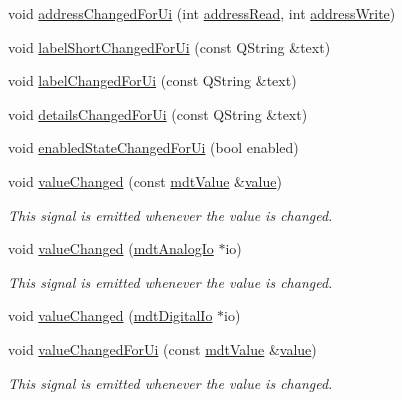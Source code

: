 \begin{DoxyCompactItemize}
\item 
void \hyperlink{classmdt_abstract_io_ab7021086e4d4ded1e4487a2e60383d0e}{address\-Changed\-For\-Ui} (int \hyperlink{classmdt_abstract_io_a710119785e128ca39092e99593bc7dac}{address\-Read}, int \hyperlink{classmdt_abstract_io_aa62d29a8f8f97b3c8e382ad608048ab4}{address\-Write})
\item 
void \hyperlink{classmdt_abstract_io_aa12930a4316d7679668a07855c92e625}{label\-Short\-Changed\-For\-Ui} (const Q\-String \&text)
\item 
void \hyperlink{classmdt_abstract_io_ab87859883a00193ac680c09cfef8dc84}{label\-Changed\-For\-Ui} (const Q\-String \&text)
\item 
void \hyperlink{classmdt_abstract_io_aa6add53c265560420b70852ba490c2ff}{details\-Changed\-For\-Ui} (const Q\-String \&text)
\item 
void \hyperlink{classmdt_abstract_io_a4406bc16e8decdb506b34d9ca679203e}{enabled\-State\-Changed\-For\-Ui} (bool enabled)
\item 
void \hyperlink{classmdt_abstract_io_a43feaa62996af78f64aea084122f1370}{value\-Changed} (const \hyperlink{classmdt_value}{mdt\-Value} \&\hyperlink{classmdt_abstract_io_a839b0d3a4a1d4616e5b20d744c5f75a1}{value})
\begin{DoxyCompactList}\small\item\em This signal is emitted whenever the value is changed. \end{DoxyCompactList}\item 
void \hyperlink{classmdt_abstract_io_a741fe409fdbe68002fdca3e7f7fdbac1}{value\-Changed} (\hyperlink{classmdt_analog_io}{mdt\-Analog\-Io} $\ast$io)
\begin{DoxyCompactList}\small\item\em This signal is emitted whenever the value is changed. \end{DoxyCompactList}\item 
void \hyperlink{classmdt_abstract_io_a0cde4ddd086886c50bfaeef27ac9de3b}{value\-Changed} (\hyperlink{classmdt_digital_io}{mdt\-Digital\-Io} $\ast$io)
\item 
void \hyperlink{classmdt_abstract_io_a0241183736b9bc3abb021868b9bf4273}{value\-Changed\-For\-Ui} (const \hyperlink{classmdt_value}{mdt\-Value} \&\hyperlink{classmdt_abstract_io_a839b0d3a4a1d4616e5b20d744c5f75a1}{value})
\begin{DoxyCompactList}\small\item\em This signal is emitted whenever the value is changed. \end{DoxyCompactList}\end{DoxyCompactItemize}
